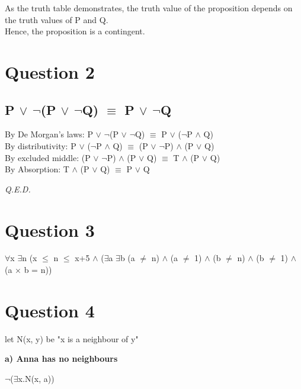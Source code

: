 \documentclass[a4paper]{article}
\begin{document}
As the truth table demonstrates, the truth value of the proposition depends on
the truth values of P and Q.\\
Hence, the proposition is a contingent.


\section*{Question 2}
\subsection*{P $\lor$ $\neg$(P $\lor$ $\neg$Q) $\equiv$ P $\lor$ $\neg$Q}
By De Morgan's laws: P $\lor$ $\neg$(P $\lor$ $\neg$Q) $\equiv$ P $\lor$ ($\neg$P $\land$ Q)\\
By distributivity:\;\;\;\;\;\;\; P $\lor$ ($\neg$P $\land$ Q) $\equiv$ (P $\lor$ $\neg$P) $\land$ (P $\lor$ Q)\\
By excluded middle:\;\; (P $\lor$ $\neg$P) $\land$ (P $\lor$ Q) $\equiv$ T $\land$ (P $\lor$ Q)\\
By Absorption:\;\;\;\;\;\;\;\;\;\; T $\land$ (P $\lor$ Q) $\equiv$ P $\lor$ Q

\vspace{10pt}

\emph{Q.E.D.}

\section*{Question 3}
$\forall$x $\exists$n (x $\le$ n $\leq$ x+5 $\land$
($\exists$a $\exists$b (a $\neq$ n) $\land$ (a $\neq$ 1) $\land$ (b $\neq$ n) $\land$ (b $\neq$ 1)
$\land$ (a $\times$ b = n))

\section*{Question 4}
\par\noindent\parskip 8pt
let N(x, y) be "x is a neighbour of y"

\par\noindent\parskip 2pt
\textbf{a) Anna has no neighbours}
\par\parskip 2pt
$\neg$($\exists$x.N(x, a))
\end{document}
